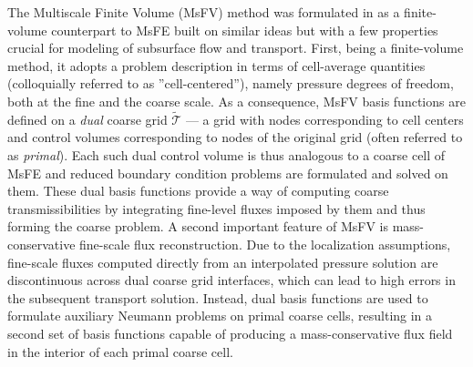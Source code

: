 The Multiscale Finite Volume (MsFV) method was formulated in \cite{Jenny2003} as a finite-volume counterpart to MsFE built on similar ideas but with a few properties crucial for modeling of subsurface flow and transport.   First, being a finite-volume method, it adopts a problem description in terms of cell-average quantities (colloquially referred to as ''cell-centered''), namely pressure degrees of freedom, both at the fine and the coarse scale.   As a consequence, MsFV basis functions are defined on a \textit{dual} coarse grid $\tilde{\mathcal{T}}$ --- a grid with nodes corresponding to cell centers and control volumes corresponding to nodes of the original grid (often referred to as \textit{primal}).   Each such dual control volume is thus analogous to a coarse cell of MsFE and reduced boundary condition problems  are formulated and solved on them.   These dual basis functions provide a way of computing coarse transmissibilities by integrating fine-level fluxes imposed by them and thus forming the coarse problem.   A second important feature of MsFV is mass-conservative fine-scale flux reconstruction.   Due to the localization assumptions, fine-scale fluxes computed directly from an interpolated pressure solution are discontinuous across dual coarse grid interfaces, which can lead to high errors in the subsequent transport solution.   Instead, dual basis functions are used to formulate auxiliary Neumann problems on primal coarse cells, resulting in a second set of basis functions capable of producing a mass-conservative flux field in the interior of each primal coarse cell.

